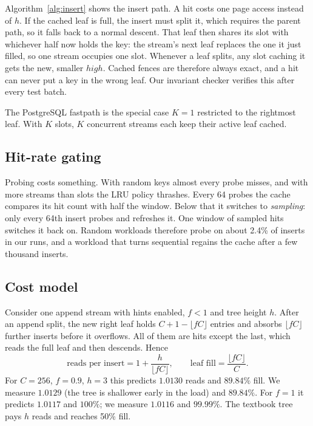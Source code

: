 \documentclass[conference]{IEEEtran}
\begin{document}
Algorithm~\ref{alg:insert} shows the insert path. A hit costs one page access
instead of $h$. If the cached leaf is full, the insert must split it, which
requires the parent path, so it falls back to a normal descent. That leaf
then shares its slot with whichever half now holds the key: the stream's
next leaf replaces the one it just filled, so one stream occupies one slot.
Whenever a leaf splits, any slot caching it gets the new, smaller
$\mathit{high}$. Cached fences are therefore always exact, and a hit can never
put a key in the wrong leaf. Our invariant checker verifies this after every
test batch.

The PostgreSQL fastpath is the special case $K=1$ restricted to the rightmost
leaf. With $K$ slots, $K$ concurrent streams each keep their active leaf
cached.

\subsection{Hit-rate gating}
Probing costs something. With random keys almost every probe misses, and with
more streams than slots the LRU policy thrashes. Every 64 probes the cache
compares its hit count with half the window. Below that it switches to
\emph{sampling}: only every 64th insert probes and refreshes it. One window of
sampled hits switches it back on. Random workloads therefore probe on about
2.4\% of inserts in our runs, and a workload that turns sequential regains the
cache after a few thousand inserts.

\subsection{Cost model}
\label{sec:model}
Consider one append stream with hints enabled, $f<1$ and tree height $h$.
After an append split, the new right leaf holds $C+1-\lfloor fC\rfloor$
entries and absorbs $\lfloor fC\rfloor$ further inserts before it overflows.
All of them are hits except the last, which reads the full leaf and then
descends. Hence
\begin{equation}
\text{reads per insert} = 1+\frac{h}{\lfloor fC\rfloor}, \qquad
\text{leaf fill} = \frac{\lfloor fC\rfloor}{C}.
\end{equation}
For $C=256$, $f=0.9$, $h=3$ this predicts $1.0130$ reads and $89.84\%$ fill.
We measure $1.0129$ (the tree is shallower early in the load) and $89.84\%$.
For $f=1$ it predicts $1.0117$ and $100\%$; we measure $1.0116$ and $99.99\%$.
The textbook tree pays $h$ reads and reaches 50\% fill.
\end{document}
